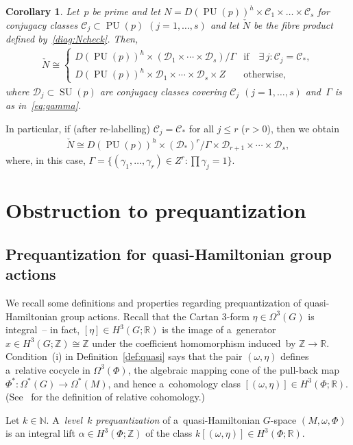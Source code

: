 \documentclass[pdftex]{sigma}
\numberwithin{equation}{section}
\newtheorem{Corollary}[Theorem]{Corollary}
\DeclareMathOperator{\SU}{SU}
\DeclareMathOperator{\PU}{PU}
\begin{document}
\begin{Corollary}
\label{cor:PUpdecomp}
Let~$p$ be prime and let $N= D(\PU(p))^h \times \mathcal{C}_1 \times \dots \times \mathcal{C}_s $ for conjugacy classes
$\mathcal{C}_j \subset \PU(p)$ $(j=1,\ldots,s)$ and let $\check{N}$ be the fibre product defined by~\eqref{diag:Ncheck}.
Then,
\begin{gather*}
\check{N} \cong
\begin{cases}
D(\PU(p))^h \times (\mathcal{D}_1 \times \cdots \times \mathcal{D}_s)/{\Gamma} & \text{if}\quad\exists\, j \colon \mathcal{C}_j=\mathcal{C}_*,
\\
D(\PU(p))^h \times {\mathcal{D}_1 \times \cdots \times \mathcal{D}_s} \times Z & \text{otherwise},
\end{cases}
\end{gather*}
where $\mathcal{D}_j \subset \SU(p)$ are conjugacy classes covering $\mathcal{C}_j$ $(j=1,\ldots,s)$ and~$\Gamma$ is as
in~\eqref{eq:gamma}.
\end{Corollary}

In particular, if (after re-labelling) $\mathcal{C}_j=\mathcal{C}_*$ for all $j\leq r$ ($r>0$), then we obtain
\begin{gather}
\label{eq:splits4PUp}
\check{N} \cong D(\PU(p))^h \times (\mathcal{D}_*)^r/{\Gamma} \times \mathcal{D}_{r+1} \times \cdots \times
\mathcal{D}_s,
\end{gather}
where, in this case, $\Gamma=\{(\gamma_1, \ldots, \gamma_r) \in Z^r \colon \prod \gamma_j=1\}$.

\section{Obstruction to prequantization}\label{sec:main}

\subsection{Prequantization for quasi-Hamiltonian group actions}\label{sec:preq}

We recall some def\/initions and properties regarding prequantization of quasi-Hamiltonian group actions.
Recall that the Cartan $3$-form $\eta \in \Omega^3(G)$ is integral~-- in fact, $[\eta] \in H^3(G;{\mathbb{R}})$ is the
image of a~generator $x\in H^3(G;{\mathbb{Z}})\cong {\mathbb{Z}}$ under the coef\/f\/icient homomorphism induced~by
${\mathbb{Z}} \to {\mathbb{R}}$.
Condition~(i) %
in Def\/inition~\ref{def:quasi} says that the pair $(\omega,\eta)$ def\/ines a~relative
cocycle in $\Omega^3(\Phi)$, the algebraic mapping cone of the pull-back map $\Phi^*\colon \Omega^*(G)\to\Omega^*(M)$,
and hence a~cohomology class $[(\omega,\eta)] \in H^3(\Phi;{\mathbb{R}})$.
(See~\cite[Chapter~I, Section~6]{BottTu} for the def\/inition of relative cohomology.)
\begin{Definition}\label{preq}
Let $k\in {\mathbb{N}}$.
A~\emph{level~$k$ prequantization} of a~quasi-Hamiltonian $G$-space $(M,\omega,\Phi)$ is an integral lift $\alpha\in
H^3(\Phi;{\mathbb{Z}})$ of the class $k[(\omega,\eta)]\in H^3(\Phi;{\mathbb{R}})$.
\end{Definition}
\end{document}
